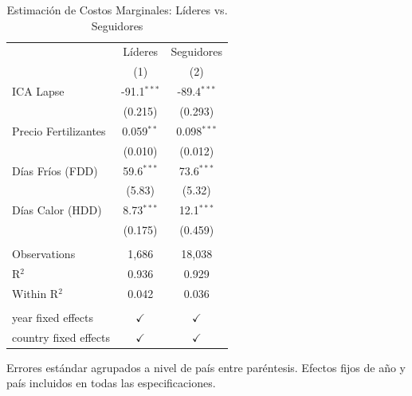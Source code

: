 
\begin{table}[htbp]
   \caption{Estimación de Costos Marginales: Líderes vs. Seguidores}
   \bigskip
   \centering
   \begin{tabular}{lcc}
      \toprule
                            & Líderes       & Seguidores \\   
                            & (1)           & (2)\\  
      \midrule 
      ICA Lapse             & -91.1$^{***}$ & -89.4$^{***}$\\   
                            & (0.215)       & (0.293)\\   
      Precio Fertilizantes  & 0.059$^{**}$  & 0.098$^{***}$\\   
                            & (0.010)       & (0.012)\\   
      Días Fríos (FDD)      & 59.6$^{***}$  & 73.6$^{***}$\\   
                            & (5.83)        & (5.32)\\   
      Días Calor (HDD)      & 8.73$^{***}$  & 12.1$^{***}$\\   
                            & (0.175)       & (0.459)\\   
       \\
      Observations          & 1,686         & 18,038\\  
      R$^2$                 & 0.936         & 0.929\\  
      Within R$^2$          & 0.042         & 0.036\\  
       \\
      year fixed effects    & $\checkmark$  & $\checkmark$\\   
      country fixed effects & $\checkmark$  & $\checkmark$\\   
      \bottomrule
   \end{tabular}
   
   \par \raggedright 
   Errores estándar agrupados a nivel de país entre paréntesis. Efectos fijos de año y país incluidos en todas las especificaciones.
\end{table}



